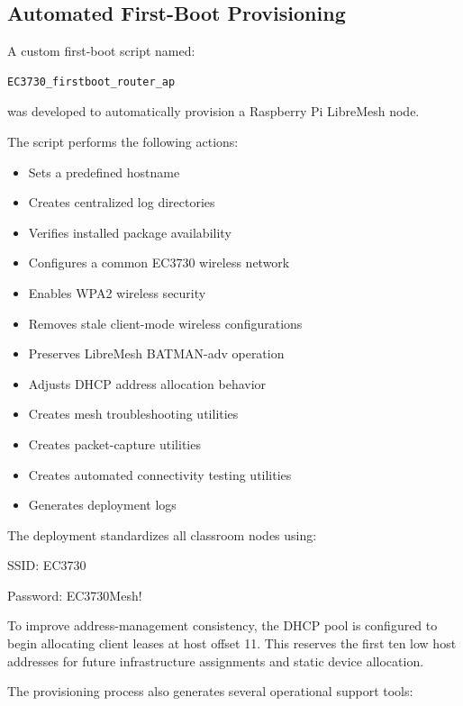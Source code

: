 \documentclass[conference]{IEEEtran}
\begin{document}
\subsection{Automated First-Boot Provisioning}

A custom first-boot script named:

\begin{verbatim}
EC3730_firstboot_router_ap
\end{verbatim}

was developed to automatically provision a Raspberry Pi LibreMesh node.

The script performs the following actions:

\begin{itemize}
    \item Sets a predefined hostname
    \item Creates centralized log directories
    \item Verifies installed package availability
    \item Configures a common EC3730 wireless network
    \item Enables WPA2 wireless security
    \item Removes stale client-mode wireless configurations
    \item Preserves LibreMesh BATMAN-adv operation
    \item Adjusts DHCP address allocation behavior
    \item Creates mesh troubleshooting utilities
    \item Creates packet-capture utilities
    \item Creates automated connectivity testing utilities
    \item Generates deployment logs
\end{itemize}

The deployment standardizes all classroom nodes using:

\begin{center}
SSID: EC3730

Password: EC3730Mesh!
\end{center}

To improve address-management consistency, the DHCP pool is configured to begin allocating client leases at host offset 11. This reserves the first ten low host addresses for future infrastructure assignments and static device allocation.

The provisioning process also generates several operational support tools:
\end{document}
